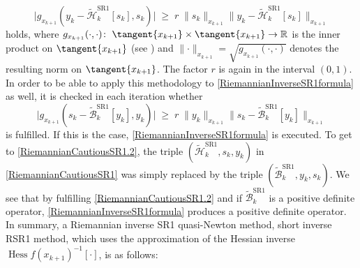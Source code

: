 \begin{equation}\label{RiemannianCautiousSR1}
    \lvert g_{x_{k+1}}(y_k - \widetilde{\mathcal{H}}^\mathrm{SR1}_k [s_k], s_k) \lvert \; \geq \; r \; \lVert s_k \rVert_{x_{k+1}} \lVert y_k - \widetilde{\mathcal{H}}^\mathrm{SR1}_k [s_k] \rVert_{x_{k+1}} 
\end{equation}
holds, where $g_{x_{k+1}}(\cdot, \cdot) \colon \; \tangent{x_{k+1}} \times \tangent{x_{k+1}} \to \mathbb{R}$ is the inner product on $\tangent{x_{k+1}}$ (see \cite[p.~6]{BergmannHerzogLouzeiroSilvaTenbrinckVidalNunez:2020:1}) and $ \lVert \cdot \rVert_{x_{k+1}} = \sqrt{g_{x_{k+1}}(\cdot, \cdot)}$ denotes the resulting norm on $\tangent{x_{k+1}}$. The factor $r$ is again in the interval $(0,1)$. In order to be able to apply this methodology to \cref{RiemannianInverseSR1formula} as well, it is checked in each iteration whether 
\begin{equation}\label{RiemannianCautiousSR1.2}
    \lvert g_{x_{k+1}}(s_k - \widetilde{\mathcal{B}}^\mathrm{SR1}_k [y_k], y_k) \lvert \; \geq \; r \; \lVert y_k \rVert_{x_{k+1}} \lVert s_k - \widetilde{\mathcal{B}}^\mathrm{SR1}_k [y_k] \rVert_{x_{k+1}} 
\end{equation}
is fulfilled. If this is the case, \cref{RiemannianInverseSR1formula} is executed. To get to \cref{RiemannianCautiousSR1.2}, the triple $(\widetilde{\mathcal{H}}^\mathrm{SR1}_k, s_k, y_k)$ in \cref{RiemannianCautiousSR1} was simply replaced by the triple $(\widetilde{\mathcal{B}}^\mathrm{SR1}_k, y_k, s_k)$. We see that by fulfilling \cref{RiemannianCautiousSR1.2} and if $\widetilde{\mathcal{B}}^\mathrm{SR1}_k$ is a positive definite operator, \cref{RiemannianInverseSR1formula} produces a positive definite operator. \\
In summary, a Riemannian inverse SR1 quasi-Newton method, short inverse RSR1 method, which uses the approximation of the Hessian inverse ${\operatorname{Hess} f(x_{k+1})}^{-1} [\cdot]$, is as follows:
